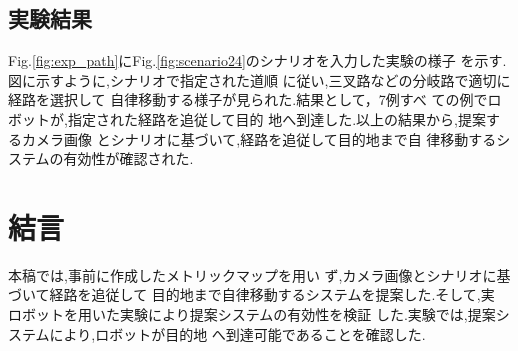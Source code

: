 \documentclass{sice-si}
\begin{document}


\subsection{実験結果}
Fig.\ref{fig:exp_path}にFig.\ref{fig:scenario24}のシナリオを入力した実験の様子
を示す.図に示すように,シナリオで指定された道順
に従い,三叉路などの分岐路で適切に経路を選択して
自律移動する様子が見られた.結果として，7例すべ
ての例でロボットが,指定された経路を追従して目的
地へ到達した.以上の結果から,提案するカメラ画像
とシナリオに基づいて,経路を追従して目的地まで自
律移動するシステムの有効性が確認された.

\section{結言}
本稿では,事前に作成したメトリックマップを用い
ず,カメラ画像とシナリオに基づいて経路を追従して
目的地まで自律移動するシステムを提案した.そして,実
ロボットを用いた実験により提案システムの有効性を検証
した.実験では,提案システムにより,ロボットが目的地
へ到達可能であることを確認した.

\end{document}
